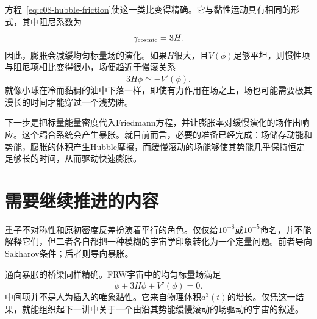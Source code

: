 \begin{classroomqa}
\end{classroomqa}

方程~\eqref{eq:c08-hubble-friction}使这一类比变得精确。它与黏性运动具有相同的形式，其中阻尼系数为
\begin{equation}
\gamma_{\rm cosmic}=3H.
\end{equation}
因此，膨胀会减缓均匀标量场的演化。如果\(H\)很大，且\(V(\phi)\)足够平坦，则惯性项与阻尼项相比变得很小，场便趋近于慢滚关系
\begin{equation}
3H\dot\phi\simeq-V'(\phi).
\end{equation}
就像小球在冷而黏稠的油中下落一样，即使有力作用在场之上，场也可能需要极其漫长的时间才能穿过一个浅势阱。

下一步是把标量能量密度代入Friedmann方程，并让膨胀率对缓慢演化的场作出响应。这个耦合系统会产生暴胀。就目前而言，必要的准备已经完成：场储存动能和势能，膨胀的体积产生Hubble摩擦，而缓慢滚动的场能够使其势能几乎保持恒定足够长的时间，从而驱动快速膨胀。

\section{需要继续推进的内容}

重子不对称性和原初密度反差扮演着平行的角色。仅仅给\(10^{-8}\)或\(10^{-5}\)命名，并不能解释它们，但二者各自都把一种模糊的宇宙学印象转化为一个定量问题。前者导向Sakharov条件；后者则导向暴胀。

通向暴胀的桥梁同样精确。FRW宇宙中的均匀标量场满足
\[
\ddot\phi+3H\dot\phi+V'(\phi)=0.
\]
中间项并不是人为插入的唯象黏性。它来自物理体积\(a^3(t)\)的增长。仅凭这一结果，就能组织起下一讲中关于一个由沿其势能缓慢滚动的场驱动的宇宙的叙述。
